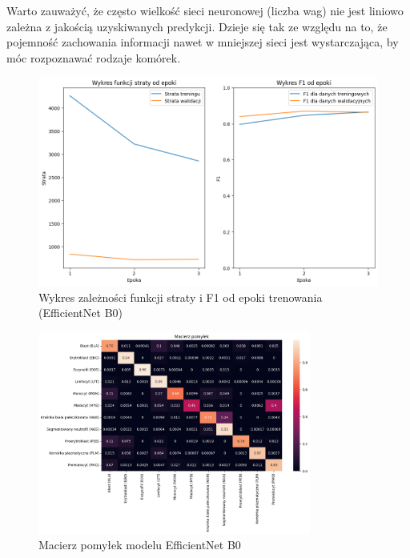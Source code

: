 Warto zauważyć, że często wielkość sieci neuronowej (liczba wag) nie jest liniowo zależna z jakością uzyskiwanych predykcji.
Dzieje się tak ze względu na to, że pojemność zachowania informacji nawet w mniejszej sieci jest wystarczająca, by móc rozpoznawać rodzaje komórek.

\begin{figure}
    \centering
    \includegraphics[width=\textwidth]{experiments/efficientnet_b0/combined}
    \caption{Wykres zależności funkcji straty i F1 od epoki trenowania (EfficientNet B0)}
    \label{fig:plot_efficientnet_b0}
\end{figure}
\begin{figure}
    \centering
    \includegraphics[width=0.8\textwidth]{experiments/efficientnet_b0/confusion_matrix}
    \caption{Macierz pomyłek modelu EfficientNet B0}
    \label{fig:confusion_efficientnet_b0}
\end{figure}

